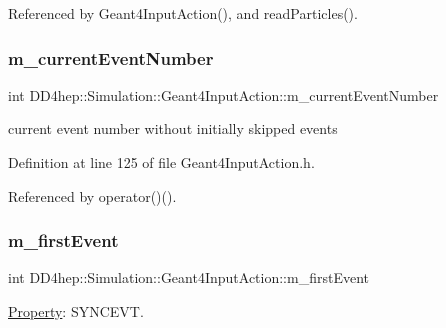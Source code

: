 Referenced by Geant4\+Input\+Action(), and read\+Particles().

\hypertarget{class_d_d4hep_1_1_simulation_1_1_geant4_input_action_a4b4cae1c79483e6f32ad70671984e422}{}\label{class_d_d4hep_1_1_simulation_1_1_geant4_input_action_a4b4cae1c79483e6f32ad70671984e422} 
\subsubsection{\texorpdfstring{m\+\_\+current\+Event\+Number}{m\_currentEventNumber}}
{\footnotesize\ttfamily int D\+D4hep\+::\+Simulation\+::\+Geant4\+Input\+Action\+::m\+\_\+current\+Event\+Number\hspace{0.3cm}{\ttfamily [protected]}}



current event number without initially skipped events 



Definition at line 125 of file Geant4\+Input\+Action.\+h.



Referenced by operator()().

\hypertarget{class_d_d4hep_1_1_simulation_1_1_geant4_input_action_a461a33c7eb46401092940394d40d99d7}{}\label{class_d_d4hep_1_1_simulation_1_1_geant4_input_action_a461a33c7eb46401092940394d40d99d7} 
\subsubsection{\texorpdfstring{m\+\_\+first\+Event}{m\_firstEvent}}
{\footnotesize\ttfamily int D\+D4hep\+::\+Simulation\+::\+Geant4\+Input\+Action\+::m\+\_\+first\+Event\hspace{0.3cm}{\ttfamily [protected]}}



\hyperlink{class_d_d4hep_1_1_property}{Property}\+: S\+Y\+N\+C\+E\+VT. 



